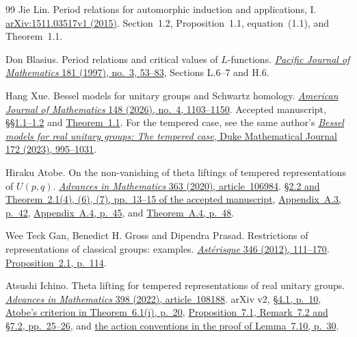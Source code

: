 \begin{thebibliography}{99}
Jie Lin.
Period relations for automorphic induction and applications, I.
\href{https://arxiv.org/abs/1511.03517v1}{arXiv:1511.03517v1 (2015)}.
Section~1.2, Proposition~1.1, equation~(1.1), and Theorem~1.1.

Don Blasius.
Period relations and critical values of \(L\)-functions.
\href{https://msp.org/pjm/1997/181-3/pjm-v181-n3-p03-s.pdf}
{\emph{Pacific Journal of Mathematics} 181 (1997), no.~3, 53--83},
Sections L.6--7 and H.6.

Hang Xue.
Bessel models for unitary groups and Schwartz homology.
\href{https://doi.org/10.1353/ajm.2026.a997141}
{\emph{American Journal of Mathematics} 148 (2026), no.~4, 1103--1150}.
Accepted manuscript, \href{https://preprint.press.jhu.edu/ajm/sites/default/files/AJM-h-xue.pdf\#page=2}
{\S\S1.1--1.2} and
\href{https://preprint.press.jhu.edu/ajm/sites/default/files/AJM-h-xue.pdf\#page=5}{Theorem~1.1}.
For the tempered case, see the same author's
\href{https://doi.org/10.1215/00127094-2022-0018}
{\emph{Bessel models for real unitary groups: The tempered case},
Duke Mathematical Journal 172 (2023), 995--1031}.

Hiraku Atobe.
On the non-vanishing of theta liftings of tempered representations of
\(U(p,q)\).
\href{https://doi.org/10.1016/j.aim.2020.106984}
{\emph{Advances in Mathematics} 363 (2020), article~106984}.
\href{https://eprints.lib.hokudai.ac.jp/repo/huscap/all/84508/Adv.\%20math\%20363_106984.pdf\#page=14}
{\S2.2 and Theorem~2.1(4), (6), (7), pp.~13--15 of the accepted manuscript},
\href{https://eprints.lib.hokudai.ac.jp/repo/huscap/all/84508/Adv.\%20math\%20363_106984.pdf\#page=43}
{Appendix~A.3, p.~42},
\href{https://eprints.lib.hokudai.ac.jp/repo/huscap/all/84508/Adv.\%20math\%20363_106984.pdf\#page=46}
{Appendix~A.4, p.~45}, and
\href{https://eprints.lib.hokudai.ac.jp/repo/huscap/all/84508/Adv.\%20math\%20363_106984.pdf\#page=49}
{Theorem~A.4, p.~48}.

Wee Teck Gan, Benedict H. Gross and Dipendra Prasad.
Restrictions of representations of classical groups: examples.
\href{https://www.numdam.org/book-part/AST_2012__346__111_0/}
{\emph{Ast\'erisque} 346 (2012), 111--170}.
\href{https://www.numdam.org/item/AST_2012__346__111_0.pdf\#page=5}
{Proposition~2.1, p.~114}.

Atsushi Ichino.
Theta lifting for tempered representations of real unitary groups.
\href{https://doi.org/10.1016/j.aim.2022.108188}
{\emph{Advances in Mathematics} 398 (2022), article~108188}.
arXiv v2, \href{https://arxiv.org/pdf/2008.06174v2\#page=10}
{\S4.1, p.~10},
\href{https://arxiv.org/pdf/2008.06174v2\#page=20}
{Atobe's criterion in Theorem~6.1(i), p.~20},
\href{https://arxiv.org/pdf/2008.06174v2\#page=25}
{Proposition~7.1, Remark~7.2 and \S7.2, pp.~25--26}, and
\href{https://arxiv.org/pdf/2008.06174v2\#page=30}
{the action conventions in the proof of Lemma~7.10, p.~30}.


\end{thebibliography}
